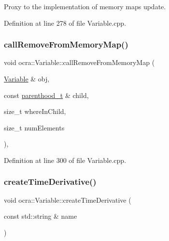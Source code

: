 Proxy to the implementation of memory maps update. 



Definition at line 278 of file Variable.\+cpp.

\hypertarget{classocra_1_1Variable_a2433c62cad31e263aba58e16b6426971}{}\label{classocra_1_1Variable_a2433c62cad31e263aba58e16b6426971} 
\subsubsection{\texorpdfstring{call\+Remove\+From\+Memory\+Map()}{callRemoveFromMemoryMap()}}
{\footnotesize\ttfamily void ocra\+::\+Variable\+::call\+Remove\+From\+Memory\+Map (\begin{DoxyParamCaption}\item[{\hyperlink{classocra_1_1Variable}{Variable} \&}]{obj,  }\item[{const \hyperlink{classocra_1_1Variable_a88444b2124cf5aab069f46734822f31f}{parenthood\+\_\+t} \&}]{child,  }\item[{size\+\_\+t}]{where\+In\+Child,  }\item[{size\+\_\+t}]{num\+Elements }\end{DoxyParamCaption})\hspace{0.3cm}{\ttfamily [static]}, {\ttfamily [protected]}}



Definition at line 300 of file Variable.\+cpp.

\hypertarget{classocra_1_1Variable_a7568587518043287ad671e53c0c04252}{}\label{classocra_1_1Variable_a7568587518043287ad671e53c0c04252} 
\subsubsection{\texorpdfstring{create\+Time\+Derivative()}{createTimeDerivative()}}
{\footnotesize\ttfamily void ocra\+::\+Variable\+::create\+Time\+Derivative (\begin{DoxyParamCaption}\item[{const std\+::string \&}]{name }\end{DoxyParamCaption})}



